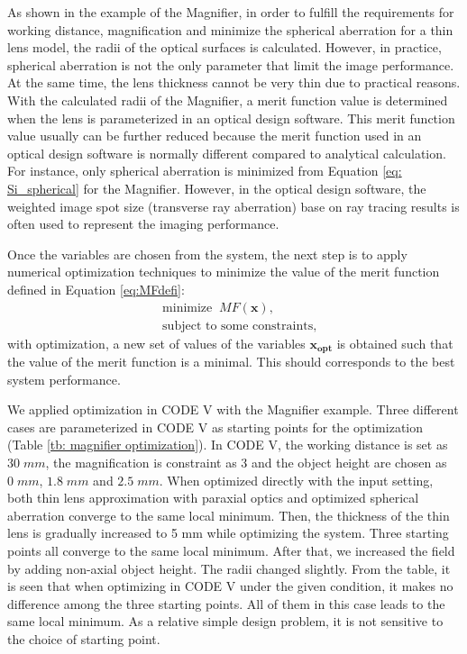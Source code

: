 As shown in the example of the Magnifier, in order to fulfill the requirements for working distance, magnification and minimize the spherical aberration for a thin lens model, the radii of the optical surfaces is calculated. However, in practice, spherical aberration is not the only parameter that limit the image performance. At the same time, the lens thickness cannot be very thin due to practical reasons. With the calculated radii of the Magnifier, a merit function value is determined when the lens is parameterized in an optical design software. This merit function value usually can be further reduced because the merit function used in an optical design software is normally different compared to analytical calculation. For instance, only spherical aberration is minimized from Equation \ref{eq: Si_spherical} for the Magnifier. However, in the optical design software, the weighted image spot size (transverse ray aberration) base on ray tracing results is often used to represent the imaging performance.   

Once the variables are chosen from the system, the next step is to apply numerical optimization techniques to minimize the value of the merit function defined in Equation \ref{eq:MFdefi}:
\begin{equation} \label{eq:MFopt_cp1}
\begin{split}
& \text{minimize}\;\; MF(\pmb{x}) ,\\
& \text{subject to some constraints},
\end{split}
\end{equation}
with optimization, a new set of values of the variables $\pmb{x_{opt}}$ is obtained such that the value of the merit function is a minimal. This should corresponds to the best system performance. 

We applied optimization in CODE V with the Magnifier example. Three different cases are parameterized in CODE V as starting points for the optimization (Table \ref{tb: magnifier optimization}). In CODE V, the working distance is set as $30 \; mm$,  the magnification is constraint as $3$ and the object height are chosen as $0 \; mm$, $1.8 \; mm$ and $2.5 \; mm$. When optimized directly with the input setting, both thin lens approximation with paraxial optics and optimized spherical aberration converge to the same local minimum. Then, the thickness of the thin lens is gradually increased to 5 mm while optimizing the system. Three starting points all converge to the same local minimum. After that, we increased the field by adding non-axial object height. The radii changed slightly. From the table, it is seen that when optimizing in CODE V under the given condition, it makes no difference among the three starting points. All of  them in this case leads to the same local minimum. As a relative simple design problem, it is not sensitive to the choice of starting point.


